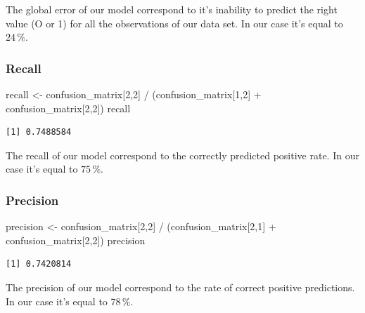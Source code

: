 \documentclass[
]{article}
\newenvironment{Shaded}{\begin{snugshade}}{\end{snugshade}}
\newcommand{\DecValTok}[1]{\textcolor[rgb]{0.00,0.00,0.81}{#1}}
\newcommand{\NormalTok}[1]{#1}
\newcommand{\OtherTok}[1]{\textcolor[rgb]{0.56,0.35,0.01}{#1}}
\newcommand{\SpecialCharTok}[1]{\textcolor[rgb]{0.00,0.00,0.00}{#1}}
\begin{document}
The global error of our model correspond to it's inability to predict
the right value (O or 1) for all the observations of our data set. In
our case it's equal to \(24\,\%\).

\hypertarget{recall}{%
\subsubsection{Recall}\label{recall}}

\begin{Shaded}
\begin{Highlighting}[]
\NormalTok{recall }\OtherTok{\textless{}{-}}\NormalTok{ confusion\_matrix[}\DecValTok{2}\NormalTok{,}\DecValTok{2}\NormalTok{] }\SpecialCharTok{/}\NormalTok{ (confusion\_matrix[}\DecValTok{1}\NormalTok{,}\DecValTok{2}\NormalTok{] }\SpecialCharTok{+}\NormalTok{ confusion\_matrix[}\DecValTok{2}\NormalTok{,}\DecValTok{2}\NormalTok{])}
\NormalTok{recall}
\end{Highlighting}
\end{Shaded}

\begin{verbatim}
[1] 0.7488584
\end{verbatim}

The recall of our model correspond to the correctly predicted positive
rate. In our case it's equal to \(75\,\%\).

\hypertarget{precision}{%
\subsubsection{Precision}\label{precision}}

\begin{Shaded}
\begin{Highlighting}[]
\NormalTok{precision }\OtherTok{\textless{}{-}}\NormalTok{ confusion\_matrix[}\DecValTok{2}\NormalTok{,}\DecValTok{2}\NormalTok{] }\SpecialCharTok{/}\NormalTok{ (confusion\_matrix[}\DecValTok{2}\NormalTok{,}\DecValTok{1}\NormalTok{] }\SpecialCharTok{+}\NormalTok{ confusion\_matrix[}\DecValTok{2}\NormalTok{,}\DecValTok{2}\NormalTok{])}
\NormalTok{precision}
\end{Highlighting}
\end{Shaded}

\begin{verbatim}
[1] 0.7420814
\end{verbatim}

The precision of our model correspond to the rate of correct positive
predictions. In our case it's equal to \(78\,\%\).
\end{document}
